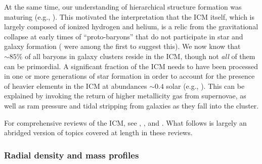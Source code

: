 At the same time, our understanding of hierarchical structure formation was maturing (e.g., \citealt{silk68,gunn72,silk77,rees77}). This motivated
the interpretation that 
the ICM itself, which is largely composed of ionized hydrogen and helium, is a
relic from the gravitational collapse at early times of ``proto-baryons'' that
do not participate in star and galaxy formation (\citealt{gunn72} were among the first to suggest this). We now know that $\sim85\%$ of all baryons in galaxy clusters reside in the ICM, 
though not {\it all} of them can be primordial. A significant fraction of the ICM
needs to have been processed in one or more generations of star formation in order to account for 
the presence of  heavier elements in the ICM at abundances $\sim0.4$ solar (e.g., \citealt{arnaud92}). This can be explained by invoking the 
return of higher metallicity gas from supernovae, as well as ram pressure and tidal stripping 
from galaxies as they fall into the cluster.

For comprehensive reviews of the ICM, see \citet{sarazin86}, \citet{mushotzky04}, and \citet{arnaud05}. 
What follows is largely an abridged version 
of topics covered at length in these reviews. 



\subsubsection{{\bf Radial density and mass profiles}}

